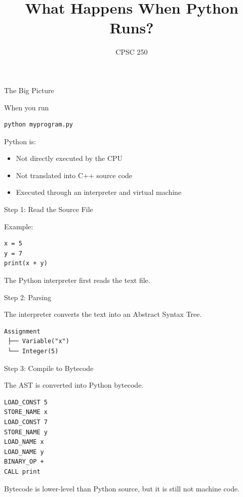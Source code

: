 \documentclass{beamer}
\title{What Happens When Python Runs?}
\author{CPSC 250}
\date{}
\begin{document}
\begin{frame}
\titlepage
\end{frame}

\begin{frame}[fragile]{The Big Picture}

When you run

\begin{verbatim}
python myprogram.py
\end{verbatim}

Python is:

\begin{itemize}
\item Not directly executed by the CPU
\item Not translated into C++ source code
\item Executed through an interpreter and virtual machine
\end{itemize}

\end{frame}

\begin{frame}[fragile]{Step 1: Read the Source File}

Example:

\begin{verbatim}
x = 5
y = 7
print(x + y)
\end{verbatim}

The Python interpreter first reads the text file.

\end{frame}

\begin{frame}[fragile]{Step 2: Parsing}

The interpreter converts the text into an Abstract Syntax Tree.

\begin{verbatim}
Assignment
 ├── Variable("x")
 └── Integer(5)
\end{verbatim}

\end{frame}

\begin{frame}[fragile]{Step 3: Compile to Bytecode}

The AST is converted into Python bytecode.

\begin{verbatim}
LOAD_CONST 5
STORE_NAME x
LOAD_CONST 7
STORE_NAME y
LOAD_NAME x
LOAD_NAME y
BINARY_OP +
CALL print
\end{verbatim}

Bytecode is lower-level than Python source,
but it is still not machine code.

\end{frame}
\end{document}
